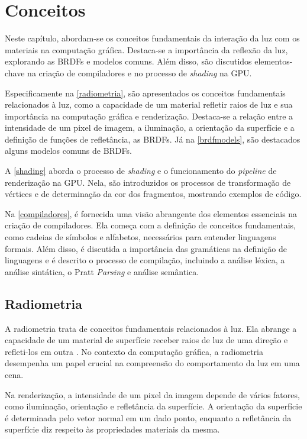 \documentclass[english, 
               brazil, 
               bsc] %
               {dcomp-abntex2}
\begin{document}
\chapter{Conceitos} \label{conceitos}


Neste capítulo, abordam-se os conceitos fundamentais da interação da luz com os materiais na computação gráfica. Destaca-se a importância da reflexão da luz, explorando as BRDFs e modelos comuns. Além disso, são discutidos elementos-chave na criação de compiladores e no processo de \textit{shading} na GPU.


Especificamente na \autoref{radiometria}, são apresentados os conceitos fundamentais relacionados à luz, como a capacidade de um material refletir raios de luz e sua importância na computação gráfica e renderização. Destaca-se a relação entre a intensidade de um pixel de imagem, a iluminação, a orientação da superfície e a definição de funções de refletância, as BRDFs. Já na \autoref{brdfmodels}, são destacados alguns modelos comuns de BRDFs.


A \autoref{shading} aborda o processo de \textit{shading} e o funcionamento do \textit{pipeline} de renderização na GPU. Nela, são introduzidos os processos de transformação de vértices e de determinação da cor dos fragmentos, mostrando exemplos de código. 


Na \autoref{compiladores}, é fornecida uma visão abrangente dos elementos essenciais na criação de compiladores. Ela começa com a definição de conceitos fundamentais, como cadeias de símbolos e alfabetos, necessários para entender linguagens formais. Além disso, é discutida a importância das gramáticas na definição de linguagens e é descrito o processo de compilação, incluindo a análise léxica, a análise sintática, o Pratt \textit{Parsing} e análise semântica.






\section{Radiometria} \label{radiometria}


A radiometria trata de conceitos fundamentais relacionados à luz. Ela abrange a capacidade de um material de superfície receber raios de luz de uma direção e refleti-los em outra 
\cite{radiometry_introduction}. No contexto da computação gráfica, a radiometria desempenha um papel crucial na compreensão do comportamento da luz em uma cena.


Na renderização, a intensidade de um pixel da imagem depende de vários fatores, como iluminação, orientação e refletância da superfície. A orientação da superfície é determinada pelo vetor normal em um dado ponto, enquanto a refletância da superfície diz respeito às propriedades materiais da mesma.
\end{document}
